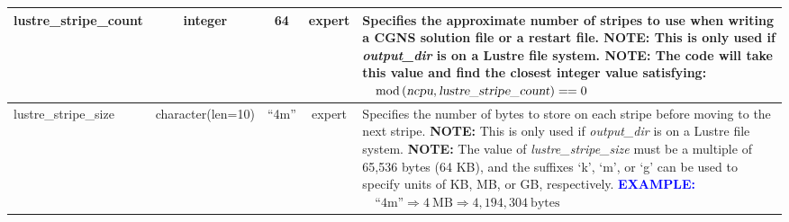 \documentclass[letterpaper,10pt]{article}
\newcommand{\slxpt}{expert}
\newcommand{\typint}{integer}
\newcommand{\tc}[1][150]{character(len=#1)}
\newcommand{\minorline}{\hline}
\newcommand{\groupline}[1]{}
\newlength{\colEwidth}
\newcommand{\descriptionbegin}{}
\newcommand{\descriptionend}{\\ \minorline}
\newcommand{\NOTE}{\newline \textcolor{OrangeRed3}{\textbf{NOTE: }}}
\newcommand{\EXAMPLE}{\newline \textcolor{blue}{\textbf{EXAMPLE: }}}
\newcommand{\eql}{\ensuremath{=\!\!\;=}}
\begin{document}
\begin{longtable}{ | l | c | c | c | p{\colEwidth} | }
    \groupline{LUSTRE FILE SYSTEM STRIPING PARAMETERS}
    lustre\_stripe\_count & \typint & 64     & \slxpt &
    \descriptionbegin
    Specifies the approximate number of stripes to use when writing a CGNS
    solution file or a restart file. \NOTE This is only used if
    \textsl{output\_dir} is on a Lustre file system. \NOTE The code
    will take this value and find the closest integer value satisfying:
    $\quad \textrm{mod} \left( \textsl{ncpu} , \textsl{lustre\_stripe\_count}
    \right) \eql 0$
    \descriptionend
    lustre\_stripe\_size  & \tc[10] & ``4m'' & \slxpt &
    \descriptionbegin
    Specifies the number of bytes to store on each stripe before moving to the
    next stripe. \NOTE This is only used if \textsl{output\_dir} is on
    a Lustre file system. \NOTE The value of \textsl{lustre\_stripe\_size}
    must be a multiple of 65,536 bytes (64 KB), and the suffixes `k', `m', or
    `g' can be used to specify units of KB, MB, or GB, respectively.
    \EXAMPLE $\quad\textrm{``4m''} \Rightarrow 4~\textrm{MB} \Rightarrow
    4,194,304~\textrm{bytes}$
    \descriptionend


\end{longtable}
\end{document}

